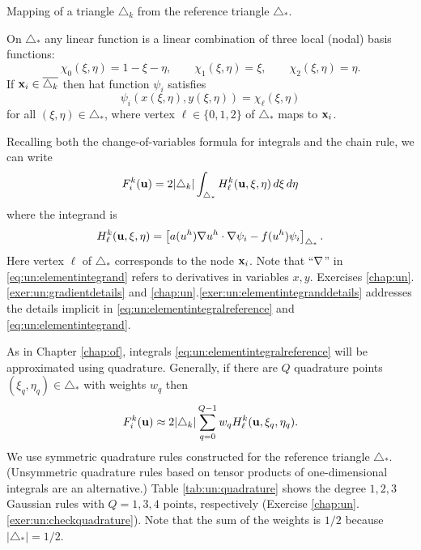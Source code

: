 \begin{marginfigure}

\caption{Mapping of a triangle $\triangle_k$ from the reference triangle $\triangle_\ast$.}
\label{fig:isoparametric}
\end{marginfigure}

On $\triangle_\ast$ any linear function is a linear combination of three local (nodal) basis functions:
\begin{equation}
\chi_0(\xi,\eta) = 1-\xi-\eta, \qquad \chi_1(\xi,\eta) = \xi, \qquad \chi_2(\xi,\eta) = \eta. \label{eq:un:chiformulas}
\end{equation}
If $\mathbf{x}_i\in\overline{\triangle_k}$ then hat function $\psi_i$ satisfies
\begin{equation}
\psi_i(x(\xi,\eta),y(\xi,\eta)) = \chi_\ell(\xi,\eta) \label{eq:un:psichimap}
\end{equation}
for all $(\xi,\eta)\in\triangle_\ast$, where vertex $\ell \in \{0,1,2\}$ of $\triangle_\ast$ maps to $\mathbf{x}_i$.

Recalling both the change-of-variables formula for integrals and the chain rule, we can write
\begin{equation}
F_i^k(\mathbf{u}) = 2 |\triangle_k| \int_{\triangle_\ast} H_\ell^k(\mathbf{u},\xi,\eta)\,d\xi\,d\eta \label{eq:un:elementintegralreference}
\end{equation}
where the integrand is
\begin{equation}
H_\ell^k(\mathbf{u},\xi,\eta) = \left[a(u^h) \nabla u^h \cdot \nabla \psi_i - f(u^h) \psi_i\right]_{\triangle_\ast}.  \label{eq:un:elementintegrand}
\end{equation}
Here vertex $\ell$ of $\triangle_\ast$ corresponds to the node $\mathbf{x}_i$.  Note that ``$\nabla$'' in \eqref{eq:un:elementintegrand} refers to derivatives in variables $x,y$.  Exercises \ref{chap:un}.\ref{exer:un:gradientdetails} and \ref{chap:un}.\ref{exer:un:elementintegranddetails} addresses the details implicit in \eqref{eq:un:elementintegralreference} and \eqref{eq:un:elementintegrand}.

As in Chapter \ref{chap:of}, integrals \eqref{eq:un:elementintegralreference} will be approximated using quadrature.  Generally, if there are $Q$ quadrature points $(\xi_q,\eta_q) \in \triangle_\ast$ with weights $w_q$ then
\begin{equation}
F_i^k(\mathbf{u}) \approx 2 |\triangle_k| \sum_{q=0}^{Q-1} w_q H_\ell^k(\mathbf{u},\xi_q,\eta_q). \label{eq:un:elementquadraturereference}
\end{equation}
We use symmetric quadrature rules constructed for the reference triangle $\triangle_\ast$.  (Unsymmetric quadrature rules based on tensor products of one-dimensional integrals \citep{KarniadakisSherwin2013} are an alternative.)  Table \ref{tab:un:quadrature} shows the degree $1,2,3$ Gaussian rules \citep{Dunavant1985} with $Q=1,3,4$ points, respectively (Exercise \ref{chap:un}.\ref{exer:un:checkquadrature}).  Note that the sum of the weights is $1/2$ because $|\triangle_\ast|=1/2$.

